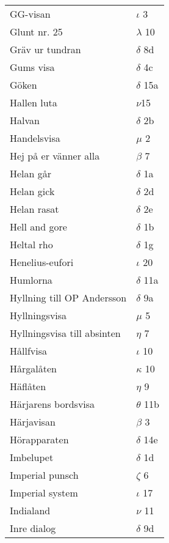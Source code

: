 \documentclass[a6paper,10pt]{article}
\begin{document}
\newpage
\setlength{\oddsidemargin}{-0.37in}
\begin{table}[!h]
\begin{tabular}{l l}
GG-visan&$\iota$ 3\\
Glunt nr. 25&$\lambda$ 10\\
Gräv ur tundran&$\delta$ 8d\\
Gums visa&$\delta$ 4c\\
Göken&$\delta$ 15a\\
Hallen luta&$\nu$15\\
Halvan&$\delta$ 2b\\
Handelsvisa&$\mu$ 2\\
Hej på er vänner alla&$\beta$ 7\\
Helan går&$\delta$ 1a\\
Helan gick&$\delta$ 2d\\
Helan rasat&$\delta$ 2e\\
Hell and gore&$\delta$ 1b\\
Heltal rho&$\delta$ 1g\\
Henelius-eufori&$\iota$ 20\\
Humlorna&$\delta$ 11a\\
Hyllning till OP Andersson&$\delta$ 9a\\
Hyllningsvisa&$\mu$ 5\\
Hyllningsvisa till absinten&$\eta$ 7\\
Hållfvisa&$\iota$ 10\\
Hårgalåten&$\kappa$ 10\\
Häflåten&$\eta$ 9\\
Härjarens bordsvisa&$\theta$ 11b\\
Härjavisan&$\beta$ 3\\
Hörapparaten&$\delta$ 14e\\
Imbelupet&$\delta$ 1d\\
Imperial punsch&$\zeta$ 6\\
Imperial system&$\iota$ 17\\
Indialand&$\nu$ 11\\
Inre dialog&$\delta$ 9d\\
\end{tabular}
\end{table}
\end{document}
